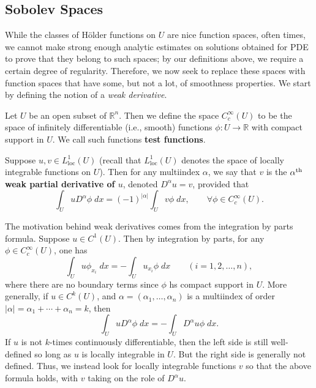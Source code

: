 \documentclass{article}
\numberwithin{equation}{section}
\begin{document}
	\subsection{Sobolev Spaces} \label{subsec:sobolev_spaces}
	While the classes of H\"older functions on $U$ are nice function spaces, often times, we cannot make strong enough analytic estimates on solutions obtained for PDE to prove that they belong to such spaces; by our definitions above, we require a certain degree of regularity. Therefore, we now seek to replace these spaces with function spaces that have some, but not a lot, of smoothness properties. We start by defining the notion of a \textit{weak derivative}. 
	
	\begin{definition}
		Let $U$ be an open subset of $\mathbb{R}^n$. Then we define the space $C_{c}^{\infty}(U)$ to be the space of infinitely differentiable (i.e., smooth) functions $\phi: U \to \mathbb{R}$ with compact support in $U$. We call such functions \textbf{test functions}. 
	\end{definition}
	
	\begin{definition}
		Suppose $u, v \in L^{1}_{\text{loc}}(U)$ (recall that $L^{1}_{\text{loc}}(U)$ denotes the space of locally integrable functions on $U$). Then for any multiindex $\alpha$, we say that $v$ is the $\alpha\textsuperscript{th}$ \textbf{weak partial derivative of $u$}, denoted $D^\alpha u = v$, provided that 
		\begin{equation}
			\int_{U}uD^\alpha \phi\;dx = (-1)^{|\alpha|}\int_{U}v\phi\;dx, \qquad \forall \phi \in C_{c}^{\infty}(U). 
		\end{equation}
	\end{definition}
	
	The motivation behind weak derivatives comes from the integration by parts formula. Suppose $u \in C^1(U)$. Then by integration by parts, for any $\phi \in C^\infty_{c}(U)$, one has 
	\begin{equation*}
		\int_{U}u\phi_{x_{i}}\;dx = -\int_{U}u_{x_{i}}\phi\;dx \qquad (i = 1, 2, \ldots, n), 
	\end{equation*}
	where there are no boundary terms since $\phi$ hs compact support in $U$. More generally, if $u \in C^k(U)$, and $\alpha = (\alpha_1, \ldots,\alpha_n)$ is a multiindex of order $|\alpha| = \alpha_{1} + \dotsm + \alpha_{n} = k$, then 
	\begin{equation*}
		\int_{U}uD^\alpha\phi\;dx = -\int_{U}D^\alpha u \phi\;dx. 
	\end{equation*}
	If $u$ is not $k$-times continuously differentiable, then the left side is still well-defined so long as $u$ is locally integrable in $U$. But the right side is generally not defined. Thus, we instead look for locally integrable functions $v$ so that the above formula holds, with $v$ taking on the role of $D^\alpha u$. 
	
\end{document}
